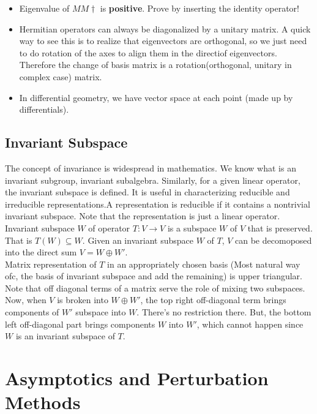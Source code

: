 \documentclass{report}
\begin{document}
\begin{itemize}
  \item Eigenvalue of $MM\dagger$ is  \textbf{positive}. Prove by inserting the identity operator!

  \item Hermitian operators can always be diagonalized by a unitary matrix. A quick way to see this is to realize that eigenvectors are orthogonal, so we just need to do rotation of the axes to align them in the directiof eigenvectors. Therefore the change of basis matrix is a rotation(orthogonal, unitary in complex case) matrix.

  \item In differential geometry, we have vector space at each point (made up by differentials).

\end{itemize}

\section{Invariant Subspace}

The concept of invariance is widespread in mathematics. We know what is an invariant subgroup, invariant subalgebra. Similarly, for a given linear operator, the invariant subspace is defined. It is useful in characterizing reducible and irreducible representations.A representation is reducible if it contains a nontrivial invariant subspace. Note that the representation is just a linear operator. Invariant subspace $W$ of operator $T:V\rightarrow V$ is a subspace $W$ of $V$ that is preserved. That is $T(W)\subseteq W$. Given an invariant subspace $W$ of $T$, $V$ can be decomoposed into the direct sum $V = W \oplus W'$.\\

\noindent Matrix representation of $T$ in an appropriately chosen basis (Most natural way ofc, the basis of invariant subspace and add the remaining) is upper triangular. Note that off diagonal terms of a matrix serve the role of mixing two subspaces. Now, when $V$ is broken into $W\oplus W'$, the top right off-diagonal term brings components of $W'$ subspace into $W$. There's no restriction there. But, the bottom left off-diagonal part brings components $W$ into $W'$, which cannot happen since $W$ is an invariant subspace of $T$.

\chapter{Asymptotics and Perturbation Methods}
\end{document}
